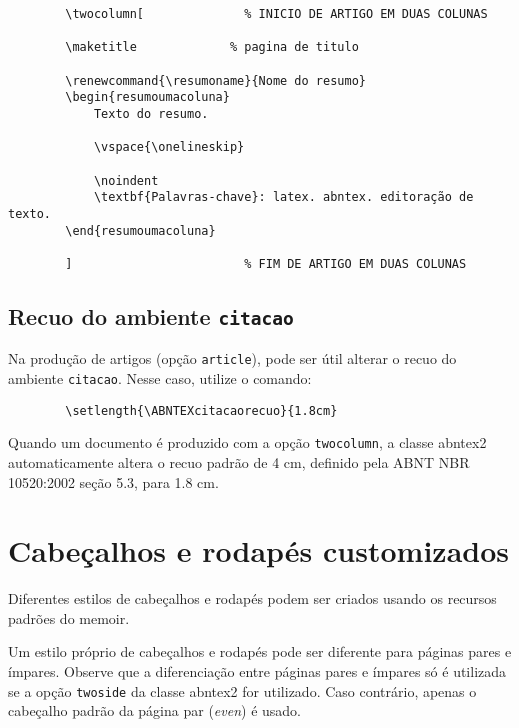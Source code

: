 \documentclass[
article,			%
11pt,				%
oneside,			%
a4paper,			%
english,			%
brazil,				%
sumario=tradicional
]{abntex2}
\begin{document}
	\begin{verbatim}
		\twocolumn[              % INICIO DE ARTIGO EM DUAS COLUNAS
		
		\maketitle             % pagina de titulo
		
		\renewcommand{\resumoname}{Nome do resumo}
		\begin{resumoumacoluna}
			Texto do resumo.
			
			\vspace{\onelineskip}
			
			\noindent
			\textbf{Palavras-chave}: latex. abntex. editoração de texto.
		\end{resumoumacoluna}
		
		]                        % FIM DE ARTIGO EM DUAS COLUNAS
	\end{verbatim}
	
	\subsection{Recuo do ambiente \texttt{citacao}}
	
	Na produção de artigos (opção \texttt{article}), pode ser útil alterar o recuo
	do ambiente \texttt{citacao}. Nesse caso, utilize o comando:
	
	\begin{verbatim}
		\setlength{\ABNTEXcitacaorecuo}{1.8cm}
	\end{verbatim}
	
	Quando um documento é produzido com a opção \texttt{twocolumn}, a classe
	\textsf{abntex2} automaticamente altera o recuo padrão de 4 cm, definido pela
	ABNT NBR 10520:2002 seção 5.3, para 1.8 cm.
	
	\section{Cabeçalhos e rodapés customizados}
	
	Diferentes estilos de cabeçalhos e rodapés podem ser criados usando os
	recursos padrões do \textsf{memoir}.
	
	Um estilo próprio de cabeçalhos e rodapés pode ser diferente para páginas pares
	e ímpares. Observe que a diferenciação entre páginas pares e ímpares só é
	utilizada se a opção \texttt{twoside} da classe \textsf{abntex2} for utilizado.
	Caso contrário, apenas o cabeçalho padrão da página par (\emph{even}) é usado.
	
\end{document}
